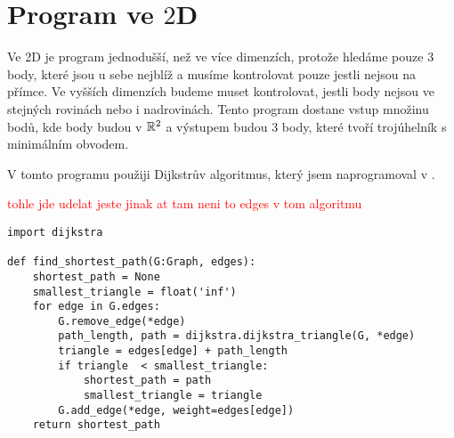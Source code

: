 \section{Program ve \texorpdfstring{$2$D}{2D}}
\label{sec:program_2D}

Ve 2D je program jednodušší, než ve více dimenzích, protože hledáme pouze 3 body, které jsou u sebe nejblíž a musíme kontrolovat pouze jestli nejsou na přímce. Ve vyšších dimenzích budeme muset kontrolovat, jestli body nejsou ve stejných rovinách nebo i nadrovinách. Tento program dostane vstup množinu bodů, kde body budou v $\mathbb{R}^2$ a výstupem budou 3 body, které tvoří trojúhelník s minimálním obvodem. 

V tomto programu použiji Dijkstrův algoritmus, který jsem naprogramoval v . 

\textcolor{red}{tohle jde udelat jeste jinak at tam neni to edges v tom algoritmu}
\begin{lstlisting}[style=metoo]
import dijkstra

def find_shortest_path(G:Graph, edges):
    shortest_path = None
    smallest_triangle = float('inf')
    for edge in G.edges:
        G.remove_edge(*edge)
        path_length, path = dijkstra.dijkstra_triangle(G, *edge)
        triangle = edges[edge] + path_length
        if triangle  < smallest_triangle:
            shortest_path = path
            smallest_triangle = triangle
        G.add_edge(*edge, weight=edges[edge])
    return shortest_path
\end{lstlisting}